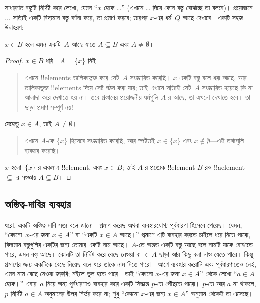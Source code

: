 \documentclass[../../../include/open-logic-section]{subfiles}
\begin{document}
সাধারণত বস্তুটি নির্দিষ্ট করে লেখো, যেমন ``$x$ হোক
\dots'' (এখানে \dots{} দিয়ে কোন বস্তু বোঝাচ্ছ তা
বলবে)। প্রয়োজনে $\dots$ সত্যিই একটি বিদ্যমান বস্তু
বর্ণনা করে, তা প্রমাণ করবে; তারপর $x$-এর ধর্ম~$Q$
আছে দেখাবে। একটি সহজ উদাহরণ:

\begin{prop}
  $x \in B$ হলে এমন একটি~$A$ আছে যাতে
  $A \subseteq B$ এবং $A \neq \emptyset$।
\end{prop}

\begin{proof}
  $x \in B$ ধরি। $A = \{x\}$ নিই।
  \begin{quote}
    এখানে !!{element}s তালিকাভুক্ত করে সেট~$A$
    সংজ্ঞায়িত করেছি। $x$ একটি বস্তু বলে ধরা আছে,
    আর তালিকাভুক্ত !!{element}s দিয়ে সেট গঠন করা যায়;
    তাই এখানে সত্যিই সেট~$A$ সংজ্ঞায়িত হয়েছে কি না
    আলাদা করে দেখাতে হয় না। তবে প্রস্তাবের প্রয়োজনীয়
    ধর্মগুলি $A$-র আছে, তা এখনো দেখাতে হবে। তা ছাড়া
    প্রমাণ সম্পূর্ণ নয়!{}
  \end{quote}
  যেহেতু $x \in A$, তাই $A \neq \emptyset$।
  \begin{quote}
    এখানে $A$-কে $\{x\}$ হিসেবে সংজ্ঞায়িত করেছি,
    আর স্পষ্টতই $x \in \{x\}$ এবং
    $x \notin \emptyset$—এই তথ্যগুলি ব্যবহার করেছি।
  \end{quote}
  $x$ হলো~$\{x\}$-র একমাত্র !!{element}, এবং
  $x \in B$; তাই $A$-র প্রত্যেক !!{element}
  $B$-রও !!a{element}। $\subseteq$-র সংজ্ঞায়
  $A \subseteq B$।
\end{proof}

\subsection{অস্তিত্ব-দাবির ব্যবহার}

ধরো, একটি অস্তিত্ব-দাবি সত্য বলে জানো—প্রমাণ করেছ
অথবা ব্যবহারযোগ্য পূর্বধারণা হিসেবে পেয়েছ। যেমন,
``কোনো~$x$-এর জন্য $x \in A$'' বা ``একটি
$x \in A$ আছে।'' প্রমাণে এটি ব্যবহার করতে
চাইলে ধরে নিতে পারো, বিদ্যমান বস্তুগুলির একটির
জন্য তোমার একটি নাম আছে। $A$-তে অন্তত একটি
বস্তু আছে বলে নামটি যাকে বোঝাতে পারে, এমন
বস্তু আছে। কোনটি তা নির্দিষ্ট করে বেছে নেওয়া বা
$\in A$ ছাড়া আর কিছু বলা নাও যেতে পারে। কিন্তু
প্রমাণের জন্য একটিকে বেছে নিয়েছ বলে ধরে তাকে
নাম দিতে পারো। আগে ব্যবহার করোনি এবং
পূর্বধারণাতেও নেই, এমন নাম বেছে নেওয়া জরুরি;
নইলে ভুল হতে পারে। তাই ``কোনো $x$-এর জন্য
$x \in A$'' থেকে লেখো ``$a \in A$ হোক।''
এবার~$a$ নিয়ে অন্য পূর্বধারণাও ব্যবহার করে
একটি সিদ্ধান্ত $p$-তে পৌঁছতে পারো। $p$-তে আর
$a$ না থাকলে, $p$ নির্দিষ্ট $a \in A$ অনুমানের
উপর নির্ভর করে না; শুধু ``কোনো $x$-এর জন্য
$x \in A$'' অনুমান থেকেই তা এসেছে।
\end{document}
